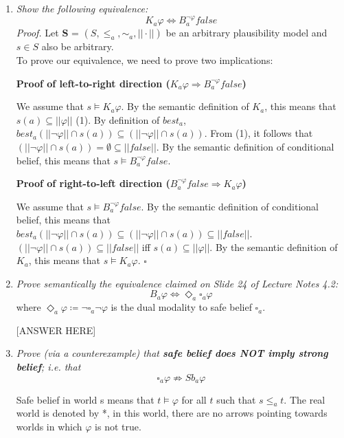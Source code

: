 \documentclass[leqno]{article}
\begin{document}
\begin{enumerate}[label=(\alph*)]
	\item \textit{Show the following equivalence:}
		$$K_a \varphi \Leftrightarrow B_a^{\neg \varphi} false$$
		\textit{Proof.} Let \textbf{S} = $(S, \le_a, \sim_a, ||\cdot||)$ be an 
		arbitrary plausibility model and $s \in S$ also be arbitrary.\\
		To prove our equivalence, we need to prove two implications:
		
		\textbf{Proof of left-to-right direction 
		($K_a \varphi \Rightarrow B_a^{\neg \varphi} false$)}
		
		We assume that $s \models K_a \varphi$. By the semantic definition of $K_a$,
		this means that $s(a) \subseteq ||\varphi||$ (1). By definition of $best_a$, 
		$best_a(||\neg \varphi|| \cap s(a)) \subseteq 
		(||\neg \varphi|| \cap s(a))$. From (1), it follows that 
		$(||\neg \varphi|| \cap s(a)) = \emptyset \subseteq ||false||$. By the 
		semantic definition of conditional belief, this means that 
		$s \models B_a^{\neg \varphi} false$.
		
		\textbf{Proof of right-to-left direction 
		($B_a^{\neg \varphi} false \Rightarrow K_a \varphi$)}
		
		We assume that $s \models B_a^{\neg \varphi} false$. By the semantic 
		definition of conditional belief, this means that 
		$best_a(||\neg \varphi|| \cap s(a)) \subseteq (||\neg \varphi|| \cap s(a)) 
		\subseteq ||false||$. $(||\neg \varphi|| \cap s(a)) \subseteq ||false||$ iff 
		$s(a) \subseteq ||\varphi||$. By the semantic definition of $K_a$, this means
		 that $s \models K_a \varphi$. 
		\hfill $\square$

	\item \textit{Prove semantically the equivalence claimed on Slide 24 of
		Lecture Notes 4.2:}
		$$B_a \varphi \Leftrightarrow \Diamond_a \square_a \varphi$$
		where $\Diamond_a \varphi \coloneqq \neg \square_a \neg \varphi$ is the dual
		modality to safe belief $\square_a$.

		[ANSWER HERE]

	\item \textit{Prove (via a counterexample) that \textbf{safe belief does NOT
		imply strong belief}; i.e. that}
		$$\square_a \varphi \not\Rightarrow Sb_a \varphi$$

        Safe belief in world s means that $t \models \varphi$ for all $t$ such that $s \leq_a t$. The real world is denoted by *, in this world, there are no arrows pointing towards worlds in which $\varphi$ is not true.


\end{enumerate}
\end{document}
